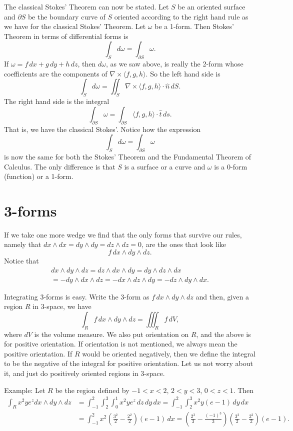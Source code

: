 \documentclass[12pt]{article}
\begin{document}
The classical Stokes' Theorem can now be stated.  Let $S$ be an oriented
surface and $\partial S$ be the boundary curve of $S$ oriented according to
the right hand rule as we have for the classical Stokes' Theorem.
Let $\omega$ be a 1-form.  Then Stokes' Theorem in terms of
differential forms is
\[
\int_S d \omega = \int_{\partial S} \omega .
\]
If $\omega = f \, dx + g \, dy + h \, dz$, then
$d \omega$, as we saw above, is really the 2-form whose coefficients are
the components of $\nabla \times \langle f , g, h \rangle$.  So the left 
hand side is
\[
\int_S d \omega = \iint_S 
\nabla \times \langle f , g, h \rangle \cdot \hat{n} \, dS .
\]
The right hand side is the integral 
\[
\int_{\partial S} \omega =
\int_{\partial S} 
\langle f , g, h \rangle \cdot \hat{t} \, ds .
\]
That is,
we have the classical Stokes'.
Notice how the expression
\[
\int_S d \omega = \int_{\partial S} \omega
\]
is now the same for both the Stokes' Theorem and the Fundamental Theorem of
Calculus.  The only difference is that $S$ is a surface or a curve
and 
$\omega$ is a 0-form (function) or a 1-form.

\section*{3-forms}

If we take one more wedge we find that the only forms that survive our
rules, namely that $dx \wedge dx = dy \wedge dy = dz \wedge dz = 0$,
are the ones that look like
\[
f \, dx \wedge dy \wedge dz .
\]
Notice that
\begin{multline*}
dx \wedge dy \wedge dz
=
dz \wedge dx \wedge dy
=
dy \wedge dz \wedge dx
\\
=
- 
dy \wedge dx \wedge dz
=
-
dx \wedge dz \wedge dy
=
-
dz \wedge dy \wedge dx .
\end{multline*}

Integrating 3-forms is easy.  Write the 3-form as $f \, dx \wedge dy \wedge
dz$ and then, given a region $R$ in 3-space, we have
\[
\int_R f \, dx \wedge dy \wedge dz
=
\iiint_R f\, dV ,
\]
where $dV$ is the volume measure.  We also put orientation on $R$, and
the above is for positive orientation.  If orientation is not mentioned, we
always mean the positive orientation.  If $R$ would be
oriented negatively, then we define the integral
to be the negative of the integral for positive orientation.
Let us not worry about it, and just do positively oriented
regions in 3-space.

Example:  Let $R$ be the region defined by $-1 < x < 2$, $2 < y < 3$, $0<z<1$.
Then
\begin{equation*}
\begin{split}
\int_R x^2 y e^z dx \wedge dy \wedge dz
& =
\int_{-1}^2 \int_2^3 \int_0^1 
x^2 y e^z \, dz \, dy \, dx
=
\int_{-1}^2 \int_2^3 
x^2 y (e-1) \, dy \, dx
\\
& =
\int_{-1}^2
x^2 \left(\frac{3^2}{2} - \frac{2^2}{2}\right) (e-1) \, dx
=
\left( \frac{2^3}{3} - \frac{(-1)^3}{3} \right) \left(\frac{3^2}{2} -
\frac{2^2}{2}\right) (e-1) .
\end{split}
\end{equation*}
\end{document}
